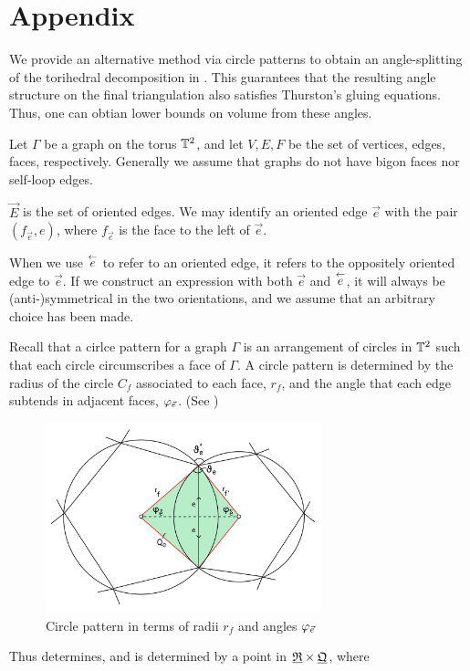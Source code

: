 \section{Appendix}

We provide an alternative method via circle patterns to obtain
an angle-splitting of the torihedral decomposition
in .
This guarantees that the resulting angle structure
on the final triangulation
also satisfies Thurston's gluing equations.
Thus, one can obtian lower bounds on volume
from these angles.


Let $\Gamma$ be a graph on the torus ${\mathbb{T}^2}$,
and let $V,E,F$ be the set of vertices, edges, faces, respectively.
Generally we assume that graphs do not have bigon faces
nor self-loop edges.


$\vec{E}$ is the set of oriented edges.
We may identify an oriented edge $\vec{e}$ with the pair $(f_{\vec{e}}, e)$,
where $f_{\vec{e}}$ is the face to the left of $\vec{e}$.


When we use $\overset{\leftarrow}{e}$ to refer to an oriented edge, it refers to
the oppositely oriented edge to $\vec{e}$.
If we construct an expression with both $\vec{e}$ and $\overset{\leftarrow}{e}$,
it will always be (anti-)symmetrical in the two orientations,
and we assume that an arbitrary choice has been made.


Recall that a cirlce pattern for a graph $\Gamma$ is an arrangement of circles
in ${\mathbb{T}^2}$ such that each circle circumscribes a face of $\Gamma$.
A circle pattern is determined by the radius of the circle $C_f$ associated to each face, $r_f$,
and the angle that each edge subtends in adjacent faces, $\varphi_{\vec{e}}$.
(See )
\begin{figure}
\includegraphics[width=8cm]{circle_pattern}
\caption{Circle pattern in terms of radii $r_f$ and angles $\varphi_{\vec{e}}$}
\label{f:circle_pattern}
\end{figure}
Thus determines, and is determined by a point in ${\underline{\mathfrak{R}}} \times {\underline{\mathfrak{Q}}}$, where


